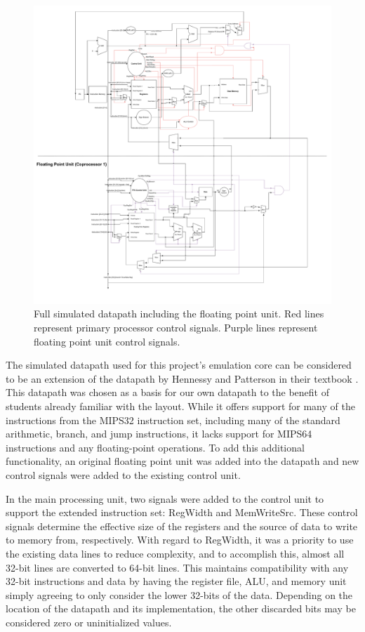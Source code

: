 \documentclass[
    paper=letter,
    parskip=half,
    fontsize=12pt,
    titlepage=firstiscover,
    toc=bibliography,
    numbers=endperiod
]{scrartcl}
\begin{document}
\begin{figure}[H]
    \includegraphics[width=\textwidth]{swim-datapath}
    \caption{Full simulated datapath including the floating point unit. Red lines represent primary processor control signals. Purple lines represent floating point unit control signals.}
\end{figure}

The simulated datapath used for this project's emulation core can be
considered to be an extension of the datapath by Hennessy and Patterson
in their textbook \cite{hennessy-patterson}. This datapath was chosen as a basis for our own
datapath to the benefit of students already familiar with the layout.
While it offers support for many of the instructions from the MIPS32
instruction set, including many of the standard arithmetic, branch, and
jump instructions, it lacks support for MIPS64 instructions and any
floating-point operations. To add this additional functionality, an
original floating point unit was added into the datapath and new control
signals were added to the existing control unit.

In the main processing unit, two signals were added to the control unit
to support the extended instruction set: RegWidth and MemWriteSrc. These
control signals determine the effective size of the registers and the
source of data to write to memory from, respectively. With regard to
RegWidth, it was a priority to use the existing data lines to reduce
complexity, and to accomplish this, almost all 32-bit lines are
converted to 64-bit lines. This maintains compatibility with any 32-bit
instructions and data by having the register file, ALU, and memory unit
simply agreeing to only consider the lower 32-bits of the data.
Depending on the location of the datapath and its implementation, the
other discarded bits may be considered zero or uninitialized values.
\end{document}
